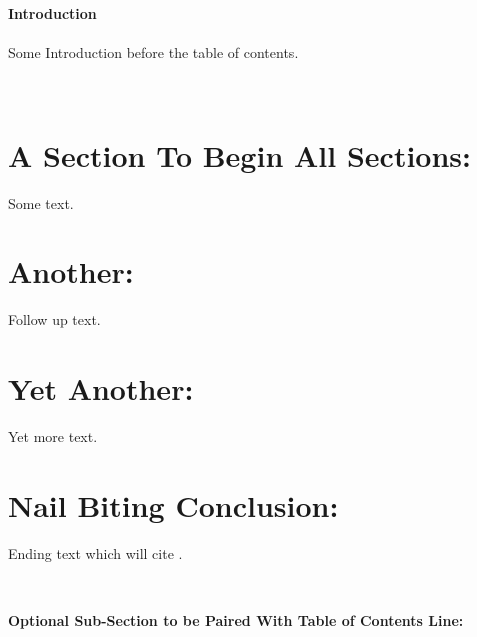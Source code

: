 \documentclass[12pt]{article}
\begin{document}
\begin{flushleft} 
\setlength{\parindent}{1cm} %




\thispagestyle{empty}
\noindent \textbf{Introduction}\\
\hfill \\
Some Introduction before the table of contents. 

\hfill \\


\tableofcontents


\thispagestyle{empty}





\clearpage
\setcounter{page}{1}

\section{A Section To Begin All Sections:}

Some text.

\section{Another:}

Follow up text.

\section{Yet Another:}

Yet more text.

\section{Nail Biting Conclusion:}

Ending text which will cite \citep{cary1967influence}.

\hfill \\


\noindent \textbf{Optional Sub-Section to be Paired With Table of Contents Line:}


\end{flushleft}
\end{document}
